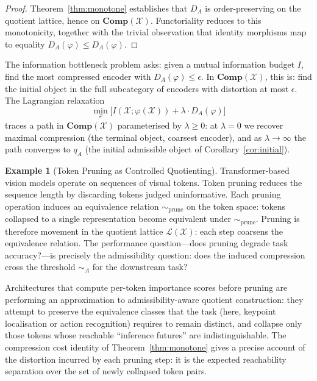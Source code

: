 \documentclass[11pt, a4paper]{article}
\theoremstyle{plain}
\theoremstyle{definition}
\newtheorem{example}[theorem]{Example}
\theoremstyle{remark}
\newcommand{\calX}{\mathcal{X}}
\newcommand{\calL}{\mathcal{L}}
\newcommand{\simA}{\sim_{\!A}}
\newcommand{\Comp}{\mathbf{Comp}}
\begin{document}
\begin{proof}
Theorem~\ref{thm:monotone} establishes that $D_A$ is order-preserving on the
quotient lattice, hence on $\Comp(\calX)$. Functoriality reduces to this
monotonicity, together with the trivial observation that identity morphisms
map to equality $D_A(\varphi) \leq D_A(\varphi)$.
\end{proof}

The information bottleneck problem asks: given a mutual information budget $I$,
find the most compressed encoder with $D_A(\varphi) \leq \epsilon$. In
$\Comp(\calX)$, this is: find the initial object in the full subcategory of
encoders with distortion at most $\epsilon$. The Lagrangian relaxation
\[
  \min_\varphi \bigl[I(\calX; \varphi(\calX)) + \lambda \cdot D_A(\varphi)\bigr]
\]
traces a path in $\Comp(\calX)$ parameterised by $\lambda \geq 0$: at
$\lambda = 0$ we recover maximal compression (the terminal object, coarsest
encoder), and as $\lambda \to \infty$ the path converges to $q_A$ (the
initial admissible object of Corollary~\ref{cor:initial}).

\begin{example}[Token Pruning as Controlled Quotienting]
\label{ex:token}
Transformer-based vision models operate on sequences of visual tokens. Token
pruning reduces the sequence length by discarding tokens judged uninformative.
Each pruning operation induces an equivalence relation $\sim_{\mathrm{prune}}$
on the token space: tokens collapsed to a single representation become
equivalent under $\sim_{\mathrm{prune}}$. Pruning is therefore movement in
the quotient lattice $\calL(\calX)$: each step coarsens the equivalence
relation. The performance question---does pruning degrade task accuracy?---is
precisely the admissibility question: does the induced compression cross the
threshold $\simA$ for the downstream task?

Architectures that compute per-token importance scores before pruning are
performing an approximation to admissibility-aware quotient construction: they
attempt to preserve the equivalence classes that the task (here, keypoint
localisation or action recognition) requires to remain distinct, and collapse
only those tokens whose reachable ``inference futures'' are indistinguishable.
The compression cost identity of Theorem~\ref{thm:monotone} gives a precise
account of the distortion incurred by each pruning step: it is the expected
reachability separation over the set of newly collapsed token pairs.
\end{example}
\end{document}
